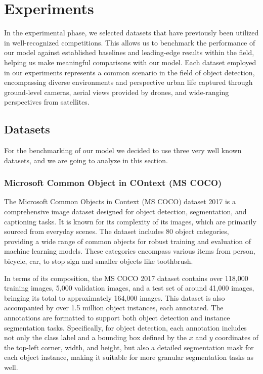 \chapter{Experiments}

In the experimental phase, we selected datasets that have previously been utilized in well-recognized competitions. This allows us to benchmark the 
performance of our model against established baselines and leading-edge results within the field, helping us make meaningful comparisons with our model. 
Each dataset employed in our experiments represents a common scenario in the field of object detection, encompassing diverse environments and perspective 
urban life captured through ground-level cameras, aerial views provided by drones, and wide-ranging perspectives from satellites. 

\section{Datasets}
For the benchmarking of our model we decided to use three very well known datasets, and we are going to analyze in this section.


\subsection{Microsoft Common Object in COntext (MS COCO)}
The Microsoft Common Objects in Context (MS COCO) dataset 2017 is a comprehensive image dataset designed for object detection, segmentation, and captioning tasks. 
It is known for its complexity of its images, which are primarily sourced from everyday scenes. The dataset includes 80 object categories, providing a wide 
range of common objects for robust training and evaluation of machine learning models. These categories encompass various items from person, bicycle, 
car, to stop sign and smaller objects like toothbrush.

In terms of its composition, the MS COCO 2017 dataset contains over 118,000 training images, 5,000 validation images, and a test set of around 41,000 images, 
bringing its total to approximately 164,000 images. This dataset is also accompanied by over 1.5 million object instances, each annotated. 
The annotations are formatted to support both object detection and instance segmentation tasks. Specifically, for object detection, each annotation includes 
not only the class label and a bounding box defined by the $x$ and $y$ coordinates of the top-left corner, width, and height, but also a detailed segmentation 
mask for each object instance, making it suitable for more granular segmentation tasks as well.

